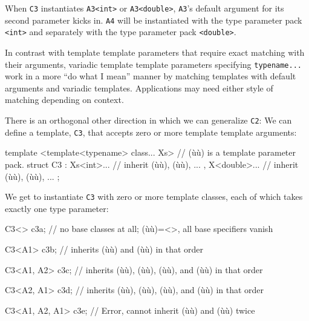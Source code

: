 \noindent When \lstinline!C3! instantiates \lstinline!A3<int>! or \lstinline!A3<double>!,
\lstinline!A3!'s default argument for its second parameter kicks in.
\lstinline!A4! will be instantiated with the type parameter pack
\lstinline!<int>! and separately with the type parameter pack
\lstinline!<double>!.

In contrast with template template parameters that require exact
matching with their arguments, variadic template template parameters
specifying \lstinline!typename...! work in a more ``do what I mean'' manner
by matching templates with default arguments and variadic templates.
Applications may need either style of matching depending on context.

There is an orthogonal other direction in which we can generalize
\lstinline!C2!: We can define a template, \lstinline!C3!, that accepts zero or
more template template arguments:

\begin{emcppslisting}
template <template<typename> class... Xs>  // (ù{}ù) is a template parameter pack.
struct C3
    : Xs<int>...    // inherit (ù{}ù), (ù{}ù), ...
    , X<double>...  // inherit (ù{}ù), (ù{}ù), ...
{ };
\end{emcppslisting}
    

\noindent We get to instantiate \lstinline!C3! with zero or more template classes,
each of which takes exactly one type parameter:

\begin{emcppslisting}
C3<>           c3a;
    // no base classes at all; (ù{}ù)=<>, all base specifiers vanish

C3<A1>         c3b;
    // inherits (ù{}ù) and (ù{}ù) in that order

C3<A1, A2>     c3c;
    // inherits (ù{}ù), (ù{}ù), (ù{}ù), and (ù{}ù) in that order

C3<A2, A1>     c3d;
    // inherits (ù{}ù), (ù{}ù), (ù{}ù), and (ù{}ù) in that order

C3<A1, A2, A1> c3e;
    // Error, cannot inherit (ù{}ù) and (ù{}ù) twice
\end{emcppslisting}
    

